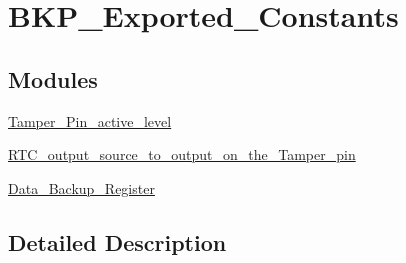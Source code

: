 \hypertarget{group___b_k_p___exported___constants}{}\section{B\+K\+P\+\_\+\+Exported\+\_\+\+Constants}
\label{group___b_k_p___exported___constants}
\subsection*{Modules}
\begin{DoxyCompactItemize}
\item 
\hyperlink{group___tamper___pin__active__level}{Tamper\+\_\+\+Pin\+\_\+active\+\_\+level}
\item 
\hyperlink{group___r_t_c__output__source__to__output__on__the___tamper__pin}{R\+T\+C\+\_\+output\+\_\+source\+\_\+to\+\_\+output\+\_\+on\+\_\+the\+\_\+\+Tamper\+\_\+pin}
\item 
\hyperlink{group___data___backup___register}{Data\+\_\+\+Backup\+\_\+\+Register}
\end{DoxyCompactItemize}


\subsection{Detailed Description}
